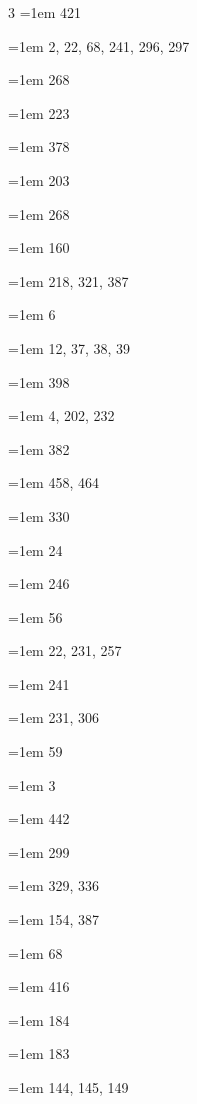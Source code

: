 \begin{multicols}{3}
\hangindent=1em  421\par
\hangindent=1em  2, 22, 68, 241, 296, 297\par
\hangindent=1em  268\par
\hangindent=1em  223\par
\hangindent=1em  378\par
\hangindent=1em  203\par
\hangindent=1em  268\par
\hangindent=1em  160\par
\hangindent=1em  218, 321, 387\par
\hangindent=1em  6\par
\hangindent=1em  12, 37, 38, 39\par
\hangindent=1em  398\par
\hangindent=1em  4, 202, 232\par
\hangindent=1em  382\par
\hangindent=1em  458, 464\par
\hangindent=1em  330\par
\hangindent=1em  24\par
\hangindent=1em  246\par
\hangindent=1em  56\par
\hangindent=1em  22, 231, 257\par
\hangindent=1em  241\par
\hangindent=1em  231, 306\par
\hangindent=1em  59\par
\hangindent=1em  3\par
\hangindent=1em  442\par
\hangindent=1em  299\par
\hangindent=1em  329, 336\par
\hangindent=1em  154, 387\par
\hangindent=1em  68\par
\hangindent=1em  416\par
\hangindent=1em  184\par
\hangindent=1em  183\par
\hangindent=1em  144, 145, 149\par

\end{multicols}

